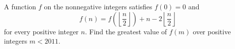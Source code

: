 A function $f$ on the nonnegative integers satisfies $f(0)=0$ and
\[f(n)=f\left(\left\lfloor\dfrac {n}{2}\right\rfloor\right)+n-2\left\lfloor\dfrac {n}{2}\right\rfloor\]
for every positive integer $n$. Find the greatest value of $f(m)$ over positive integers $m<2011$.
